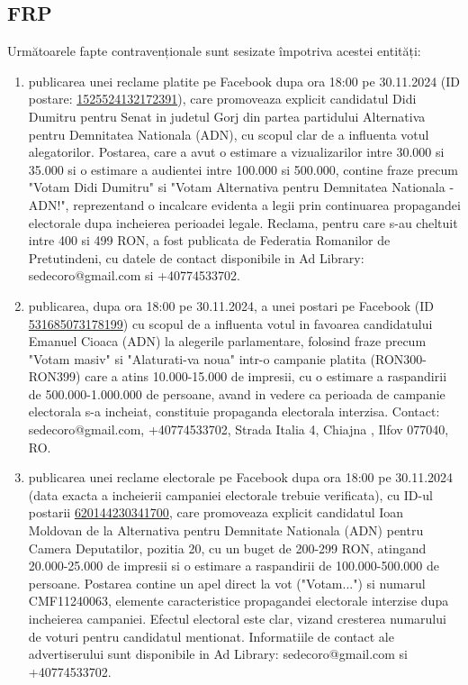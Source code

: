 \documentclass[a4paper,12pt]{article}
\begin{document}
\vspace{0.5cm}

\subsection{FRP}
Următoarele fapte contravenționale sunt sesizate împotriva acestei entități:

\begin{enumerate}[leftmargin=*, label=\arabic*.)]
    \item publicarea unei reclame platite pe Facebook dupa ora 18:00 pe 30.11.2024 (ID postare: \href{https://www.facebook.com/ads/library/?id=1525524132172391}{1525524132172391}), care promoveaza explicit candidatul Didi Dumitru pentru Senat in judetul Gorj din partea partidului Alternativa pentru Demnitatea Nationala (ADN), cu scopul clar de a influenta votul alegatorilor.  Postarea, care a avut o estimare a vizualizarilor intre 30.000 si 35.000 si o estimare a audientei intre 100.000 si 500.000, contine fraze precum "Votam Didi Dumitru" si "Votam Alternativa pentru Demnitatea Nationala - ADN!", reprezentand o incalcare evidenta a legii prin continuarea propagandei electorale dupa incheierea perioadei legale.  Reclama, pentru care s-au cheltuit intre 400 si 499 RON, a fost publicata de Federatia Romanilor de Pretutindeni, cu datele de contact disponibile in Ad Library: sedecoro@gmail.com si +40774533702.
    \item publicarea, dupa ora 18:00 pe 30.11.2024, a unei postari pe Facebook (ID \href{https://www.facebook.com/ads/library/?id=531685073178199}{531685073178199}) cu scopul de a influenta votul in favoarea candidatului Emanuel Cioaca (ADN) la alegerile parlamentare, folosind fraze precum "Votam masiv" si "Alaturati-va noua" intr-o campanie platita (RON300-RON399) care a atins 10.000-15.000 de impresii, cu o estimare a raspandirii de 500.000-1.000.000 de persoane, avand in vedere ca perioada de campanie electorala s-a incheiat,  constituie propaganda electorala interzisa.  Contact: sedecoro@gmail.com, +40774533702, Strada Italia 4, Chiajna , Ilfov 077040, RO.
    \item publicarea unei reclame electorale pe Facebook dupa ora 18:00 pe 30.11.2024 (data exacta a incheierii campaniei electorale trebuie verificata), cu ID-ul postarii \href{https://www.facebook.com/ads/library/?id=620144230341700}{620144230341700}, care promoveaza explicit candidatul Ioan Moldovan de la Alternativa pentru Demnitate Nationala (ADN) pentru Camera Deputatilor, pozitia 20, cu un buget de 200-299 RON, atingand 20.000-25.000 de impresii si o estimare a raspandirii de 100.000-500.000 de persoane.  Postarea contine un apel direct la vot ("Votam...") si numarul CMF11240063, elemente caracteristice propagandei electorale interzise dupa incheierea campaniei.  Efectul electoral este clar, vizand cresterea numarului de voturi pentru candidatul mentionat.  Informatiile de contact ale advertiserului sunt disponibile in Ad Library: sedecoro@gmail.com si +40774533702.

\end{enumerate}
\end{document}
